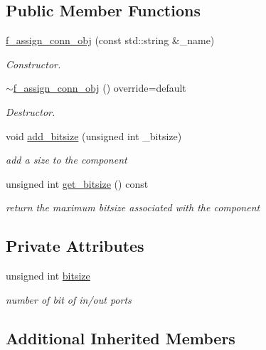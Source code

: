 \subsection*{Public Member Functions}
\begin{DoxyCompactItemize}
\item 
\hyperlink{classf__assign__conn__obj_a555ff56711d5808d1cd3904b9672a767}{f\+\_\+assign\+\_\+conn\+\_\+obj} (const std\+::string \&\+\_\+name)
\begin{DoxyCompactList}\small\item\em Constructor. \end{DoxyCompactList}\item 
\hyperlink{classf__assign__conn__obj_a8a742f50acd7fe98a066b4157be90606}{$\sim$f\+\_\+assign\+\_\+conn\+\_\+obj} () override=default
\begin{DoxyCompactList}\small\item\em Destructor. \end{DoxyCompactList}\item 
void \hyperlink{classf__assign__conn__obj_a6e8e1b379e465cf509560b0101a55d7d}{add\+\_\+bitsize} (unsigned int \+\_\+bitsize)
\begin{DoxyCompactList}\small\item\em add a size to the component \end{DoxyCompactList}\item 
unsigned int \hyperlink{classf__assign__conn__obj_a166bc7d1dbabee02c498a9ae3d5d85df}{get\+\_\+bitsize} () const
\begin{DoxyCompactList}\small\item\em return the maximum bitsize associated with the component \end{DoxyCompactList}\end{DoxyCompactItemize}
\subsection*{Private Attributes}
\begin{DoxyCompactItemize}
\item 
unsigned int \hyperlink{classf__assign__conn__obj_a04eb19fba311c3a6d11da5af72846a50}{bitsize}
\begin{DoxyCompactList}\small\item\em number of bit of in/out ports \end{DoxyCompactList}\end{DoxyCompactItemize}
\subsection*{Additional Inherited Members}


